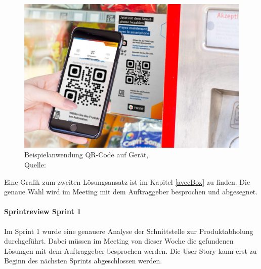 \begin{figure}[H]
	\centering
	\includegraphics[scale=0.3]{images/QR-CodeOnMachine.jpg}
	\caption[Beispielanwendung QR-Code auf Gerät]{Beispielanwendung QR-Code auf Gerät,\\ Quelle: \cite{imageQRCodeTwint}}
	\label{img: Beispielanwendung QR-Code auf Geraet}
\end{figure}
Eine Grafik zum zweiten Lösungsansatz ist im Kapitel \ref{avecBox} zu finden. 
Die genaue Wahl wird im Meeting mit dem Auftraggeber besprochen und abgesegnet. 

\paragraph{Sprintreview Sprint 1}
Im Sprint 1 wurde eine genauere Analyse der Schnittstelle zur Produktabholung durchgeführt. Dabei müssen im Meeting von dieser Woche die gefundenen Lösungen mit dem Auftraggeber besprochen werden. Die \gls{User Story} kann erst zu Beginn des nächsten Sprints abgeschlossen werden. 

